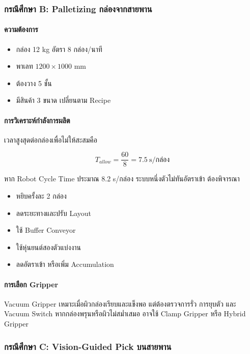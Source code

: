 \subsubsection{กรณีศึกษา B: Palletizing กล่องจากสายพาน}

\paragraph{ความต้องการ}

\begin{itemize}
    \item กล่อง 12 kg อัตรา 8 กล่อง/นาที
    \item พาเลท $1200\times1000$ mm
    \item ต้องวาง 5 ชั้น
    \item มีสินค้า 3 ขนาด เปลี่ยนตาม Recipe
\end{itemize}

\paragraph{การวิเคราะห์กำลังการผลิต}

เวลาสูงสุดต่อกล่องเพื่อไม่ให้สะสมคือ

\[
T_{allow}=\frac{60}{8}=7.5\ \text{s/กล่อง}
\]

หาก Robot Cycle Time ประมาณ 8.2 s/กล่อง ระบบหนึ่งตัวไม่ทันอัตราเข้า ต้องพิจารณา

\begin{itemize}
    \item หยิบครั้งละ 2 กล่อง
    \item ลดระยะทางและปรับ Layout
    \item ใช้ Buffer Conveyor
    \item ใช้หุ่นยนต์สองตัวแบ่งงาน
    \item ลดอัตราเข้า หรือเพิ่ม Accumulation
\end{itemize}

\paragraph{การเลือก Gripper}

Vacuum Gripper เหมาะเมื่อผิวกล่องเรียบและแข็งพอ แต่ต้องตรวจการรั่ว การยุบตัว และ Vacuum Switch หากกล่องพรุนหรือผิวไม่สม่ำเสมอ อาจใช้ Clamp Gripper หรือ Hybrid Gripper

\subsubsection{กรณีศึกษา C: Vision-Guided Pick บนสายพาน}


